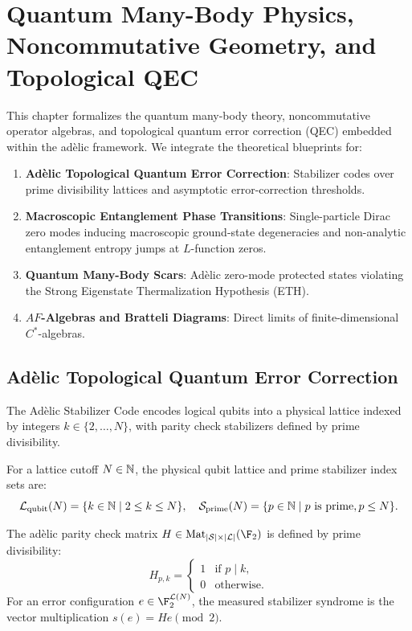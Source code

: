 \chapter{Quantum Many-Body Physics, Noncommutative Geometry, and Topological QEC}
\label{chap:quantum}

This chapter formalizes the quantum many-body theory, noncommutative operator algebras, and topological quantum error correction (QEC) embedded within the adèlic framework. We integrate the theoretical blueprints for:
\begin{enumerate}
    \item \textbf{Adèlic Topological Quantum Error Correction}: Stabilizer codes over prime divisibility lattices and asymptotic error-correction thresholds.
    \item \textbf{Macroscopic Entanglement Phase Transitions}: Single-particle Dirac zero modes inducing macroscopic ground-state degeneracies and non-analytic entanglement entropy jumps at $L$-function zeros.
    \item \textbf{Quantum Many-Body Scars}: Adèlic zero-mode protected states violating the Strong Eigenstate Thermalization Hypothesis (ETH).
    \item \textbf{$AF$-Algebras and Bratteli Diagrams}: Direct limits of finite-dimensional $C^*$-algebras.
\end{enumerate}

\section{Adèlic Topological Quantum Error Correction}

The Adèlic Stabilizer Code encodes logical qubits into a physical lattice indexed by integers $k \in \{2, \ldots, N\}$, with parity check stabilizers defined by prime divisibility.

\begin{definition}
\label{def:qec_lattice}
\leanok
For a lattice cutoff $N \in \mathbb{N}$, the physical qubit lattice and prime stabilizer index sets are:
\[
\mathcal{L}_{\mathrm{qubit}}(N) = \{ k \in \mathbb{N} \mid 2 \le k \le N \}, \quad 
\mathcal{S}_{\mathrm{prime}}(N) = \{ p \in \mathbb{N} \mid p \text{ is prime}, p \le N \}.
\]
\end{definition}

\begin{definition}
\label{def:qec_parity_check}
\leanok
The adèlic parity check matrix $H \in \Mat_{|\mathcal{S}| \times |\mathcal{L}|}(\F_2)$ is defined by prime divisibility:
\[
H_{p, k} = \begin{cases}
1 & \text{if } p \mid k, \\
0 & \text{otherwise}.
\end{cases}
\]
For an error configuration $e \in \F_2^{\mathcal{L}(N)}$, the measured stabilizer syndrome is the vector multiplication $s(e) = H e \pmod 2$.
\end{definition}


